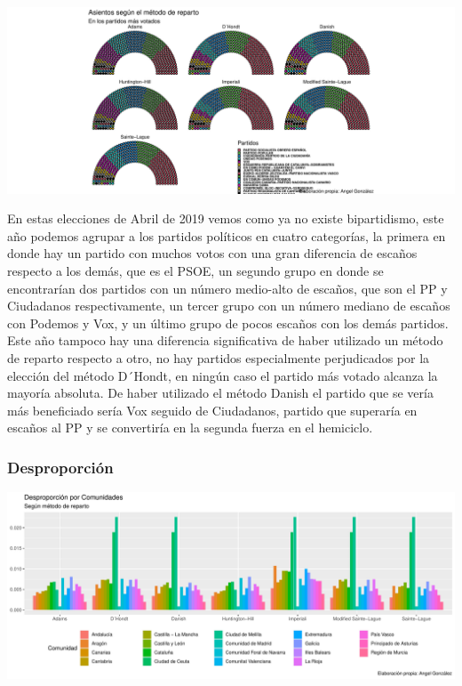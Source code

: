 \documentclass[12pt,a4paper,]{book}
\numberwithin{dummy}{section}
\theoremstyle{ocrenumbox}
\theoremstyle{blacknumex}
\theoremstyle{blacknumbox}
\theoremstyle{ocrenum}
\theoremstyle{ocrenum}
\begin{document}
\begin{center}\includegraphics[width=0.95\linewidth]{figurasR/unnamed-chunk-176-3} \end{center}

En estas elecciones de Abril de 2019 vemos como ya no existe
bipartidismo, este año podemos agrupar a los partidos políticos en
cuatro categorías, la primera en donde hay un partido con muchos votos
con una gran diferencia de escaños respecto a los demás, que es el PSOE,
un segundo grupo en donde se encontrarían dos partidos con un número
medio-alto de escaños, que son el PP y Ciudadanos respectivamente, un
tercer grupo con un número mediano de escaños con Podemos y Vox, y un
último grupo de pocos escaños con los demás partidos. Este año tampoco
hay una diferencia significativa de haber utilizado un método de reparto
respecto a otro, no hay partidos especialmente perjudicados por la
elección del método D´Hondt, en ningún caso el partido más votado
alcanza la mayoría absoluta. De haber utilizado el método Danish el
partido que se vería más beneficiado sería Vox seguido de Ciudadanos,
partido que superaría en escaños al PP y se convertiría en la segunda
fuerza en el hemiciclo.

\hypertarget{desproporciuxf3n-13}{%
\subsubsection{Desproporción}\label{desproporciuxf3n-13}}

\begin{center}\includegraphics[width=0.95\linewidth]{figurasR/unnamed-chunk-177-1} \end{center}
\end{document}
